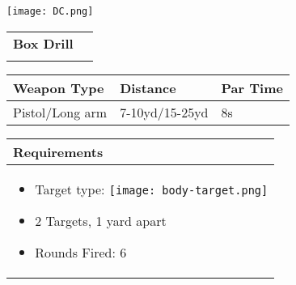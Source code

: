 \documentclass[../Cover.tex]{subfiles}
\begin{document}
	\begin{minipage}[t][0.2\textheight][t]{0.1\textwidth} 
		\texttt{[image: DC.png]}
	\end{minipage}
	\hfill
	\begin{minipage}[t][0.15\textheight][t]{0.8\textwidth}
		\begin{tabular}{ p{} l  }			
			\textbf{Box Drill} \\
			\\[0.09\textheight]
		\end{tabular}
		\quad
		\begin{tabular}{ | p{} | p{} | p{} |}
			\hline
			\tiny Weapon Type & \tiny Distance & \tiny Par Time\\ 
			\hline
			\tiny Pistol/Long arm & \tiny 7-10yd/15-25yd & \tiny 8s \\ %
			\hline
		\end{tabular}
	\end{minipage}
	\begin{tabular}{p{}}
		\small Requirements \\
		\hline
		\tiny \begin{itemize} %
			\item Target type: \texttt{[image: body-target.png]}
			\item 2 Targets, 1 yard apart
			\item Rounds Fired: 6
		\end{itemize}				
		\\[0.6\textheight]
	\end{tabular}
\end{document}
